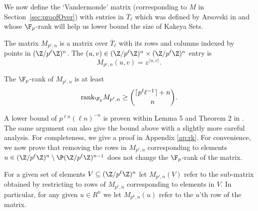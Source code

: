 We now define the `Vandermonde' matrix (corresponding to $M$ in Section~\ref{sec:proofOver}) with entries in $\overline{T}_{\ell}$ which was defined by Arsovski in \cite{arsovski2021padic} and whose $\F_p$-rank will help us lower bound the size of Kakeya Sets.

\begin{define}
The matrix $M_{p^\ell,n}$ is a matrix over $\overline{T}_{\ell}$ with its rows and columns indexed by points in $(\Z/p^\ell\Z)^n$. The $(u,v)\in (\Z/p^\ell\Z)^n\times (\Z/p^\ell\Z)^n$ entry is
$$M_{p^\ell,n}(u,v)=z^{\langle u, v\rangle}.$$
\end{define}


\begin{lem}\label{lem:1rank}
The $\F_p$-rank of $M_{p^\ell,n}$ is at least 
{\em $$\text{rank}_{\F_p} M_{p^\ell,n} \ge \binom{\lceil p^\ell \ell^{-1} \rceil +n}{n}.$$}
\end{lem}
A lower bound of $p^{\ell n} (\ell n)^{-n}$ is proven within Lemma 5 and Theorem 2 in \cite{arsovski2021padic}. The same argument can also give the bound above with a slightly more careful analysis. For completeness, we give a proof in Appendix \ref{ap:rk}. For convenience, we now prove that removing the rows in $M_{p^\ell,n}$ corresponding to elements $u\in (\Z/p^\ell\Z)^n\setminus\P (\Z/p^\ell\Z)^{n-1}$ does not change the $\F_p$-rank of the matrix. 

For a given set of elements $V\subseteq (\Z/p^\ell\Z)^{n}$ let $M_{p^\ell,n}(V)$ refer to the sub-matrix obtained by restricting to rows of $M_{p^\ell,n}$ corresponding to elements in $V$. In particular, for any given $u\in R^n$ we let $M_{p^k,n}(u)$ refer to the $u$'th row of the matrix.

